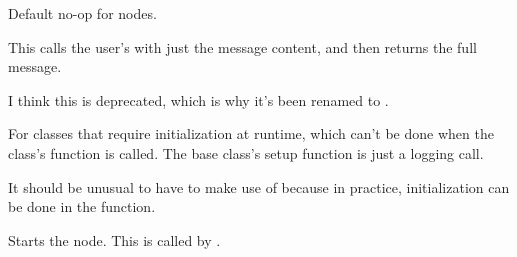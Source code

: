 \documentclass[letterpaper,10pt,english]{sphinxmanual}
\begin{document}
\begin{fulllineitems}
\begin{fulllineitems}
\begin{description}
\end{description}

\end{fulllineitems}


\begin{fulllineitems}
\label{\detokenize{api:nanostream.node.NanoNode.process_item}}
Default no-op for nodes.

\end{fulllineitems}


\begin{fulllineitems}
\label{\detokenize{api:nanostream.node.NanoNode.processor_bak}}
This calls the user’s  with just the message content,
and then returns the full message.

I think this is deprecated, which is why it’s been renamed to .

\end{fulllineitems}


\begin{fulllineitems}
\label{\detokenize{api:nanostream.node.NanoNode.setup}}
For classes that require initialization at runtime, which can’t be done
when the class’s  function is called. The  base
class’s setup function is just a logging call.

It should be unusual to have to make use of  because in practice,
initialization can be done in the  function.

\end{fulllineitems}


\begin{fulllineitems}
\label{\detokenize{api:nanostream.node.NanoNode.start}}
Starts the node. This is called by .


\end{fulllineitems}
\end{fulllineitems}
\end{document}
